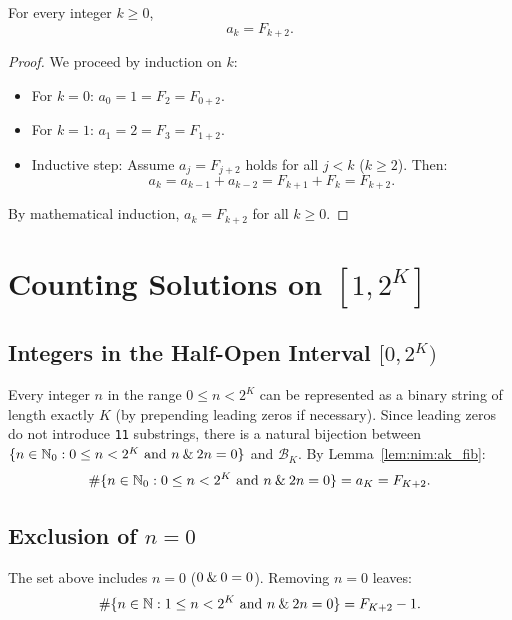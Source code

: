 ﻿\documentclass[a4paper]{article}
\begin{document}
\begin{lemma}\label{lem:nim:ak_fib}
For every integer $k \ge 0$,
\begin{equation}
a_k = F_{k+2}.
\end{equation}
\end{lemma}

\begin{proof}
We proceed by induction on $k$:
\begin{itemize}
    \item For $k = 0$: $a_0 = 1 = F_2 = F_{0+2}$.
    \item For $k = 1$: $a_1 = 2 = F_3 = F_{1+2}$.
    \item Inductive step: Assume $a_j = F_{j+2}$ holds for all $j < k$ ($k \ge 2$). Then:
    \begin{equation}
    a_k = a_{k-1} + a_{k-2} = F_{k+1} + F_k = F_{k+2}.
    \end{equation}
\end{itemize}
By mathematical induction, $a_k = F_{k+2}$ for all $k \ge 0$.
\end{proof}


\section{Counting Solutions on $[1, 2^K]$}

\subsection{Integers in the Half-Open Interval $[0, 2^K)$}
Every integer $n$ in the range $0 \le n < 2^K$ can be represented as a binary string of length exactly $K$ (by prepending leading zeros if necessary). Since leading zeros do not introduce \texttt{11} substrings, there is a natural bijection between $\{ n \in \mathbb{N}_0 : 0 \le n < 2^K \text{ and } n \mathbin{\&} 2n = 0 \}$ and $\mathcal{B}_K$.
By Lemma~\ref{lem:nim:ak_fib}:
\begin{equation}
\#\{ n \in \mathbb{N}_0 : 0 \le n < 2^K \text{ and } n \mathbin{\&} 2n = 0 \} = a_K = F_{K+2}.
\end{equation}

\subsection{Exclusion of $n = 0$}
The set above includes $n = 0$ ($0 \mathbin{\&} 0 = 0$). Removing $n = 0$ leaves:
\begin{equation}
\#\{ n \in \mathbb{N} : 1 \le n < 2^K \text{ and } n \mathbin{\&} 2n = 0 \} = F_{K+2} - 1.
\end{equation}
\end{document}
